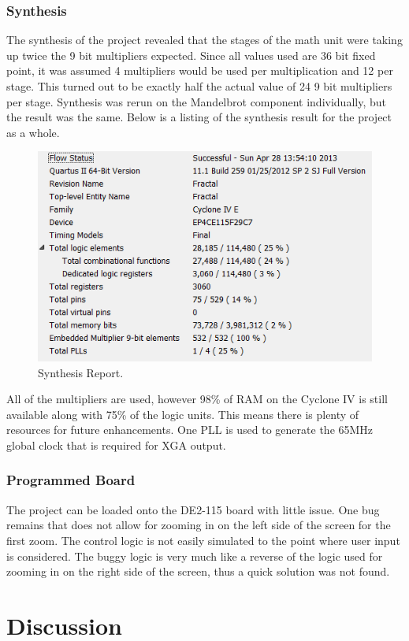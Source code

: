 \documentclass[titlepage]{article}      %
\begin{document}
\subsubsection{Synthesis}
The synthesis of the project revealed that the stages of the math unit were taking up twice the 9 bit multipliers expected. Since all values used are 36 bit fixed point, it was assumed 4 multipliers would be used per multiplication and 12 per stage. This turned out to be exactly half the actual value of 24 9 bit multipliers per stage. Synthesis was rerun on the Mandelbrot component individually, but the result was the same. Below is a listing of the synthesis result for the project as a whole.
\begin{figure}[H]
\centering
\includegraphics[width=6in]{Stat}
\caption{Synthesis Report.}
\end{figure}
All of the multipliers are used, however 98\% of RAM on the Cyclone IV is still available along with 75\% of the logic units. This means there is plenty of resources for future enhancements. One PLL is used to generate the 65MHz global clock that is required for XGA output.
\subsubsection{Programmed Board}
The project can be loaded onto the DE2-115 board with little issue. One bug remains that does not allow for zooming in on the left side of the screen for the first zoom. The control logic is not easily simulated to the point where user input is considered. The buggy logic is very much like a reverse of the logic used for zooming in on the right side of the screen, thus a quick solution was not found.
\section{Discussion}
\end{document}
